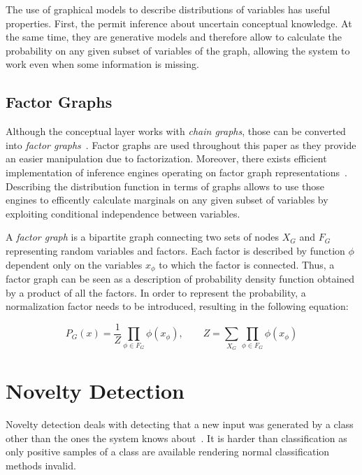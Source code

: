 \documentclass[runningheads,a4paper]{llncs}
\begin{document}
The use of graphical models to describe distributions of variables has useful properties.
First, the permit inference about uncertain conceptual knowledge. At the same time, they are 
generative models and therefore allow to calculate the probability
on any given subset of variables of the graph, allowing the system to work even when some
information is missing.


\subsection{Factor Graphs}
Although the conceptual layer works with \emph{chain graphs}, those can be converted
into \emph{factor graphs}~\cite{kschischang2001factor}. Factor graphs are used throughout this paper as they provide an
easier manipulation due to factorization.
Moreover, there exists efficient implementation of inference engines operating on factor graph
representations~\cite{Mooij_libDAI_10}.
Describing the distribution function in terms of graphs allows to use those engines to
efficently calculate marginals on any given subset of variables by exploiting conditional
independence between variables.

A \emph{factor graph} is a bipartite graph connecting two sets of nodes $X_G$ and $F_G$
representing random variables and factors.
Each factor is described by function $\phi$ dependent only on the variables $x_\phi$
to which the factor is connected.
Thus, a factor graph can be seen as a description of probability density function obtained
by a product of all the factors. In order to represent the probability,
a normalization factor needs to be introduced, resulting in the following equation:

\begin{equation}
P_G(x) = \frac{1}{Z}\prod_{\phi \in F_G}{\phi(x_{\phi})},\qquad
Z = \sum_{X_G}\prod_{\phi \in F_G}{\phi(x_{\phi})}
\end{equation}


\section{Novelty Detection}
\label{sec:novelty-detection}
Novelty detection deals with detecting that a new input was generated by a class
other than the ones the system knows about~\cite{markou2003novelty}.
It is harder than classification as only positive samples of a class are available
rendering normal classification methods invalid.
\end{document}
